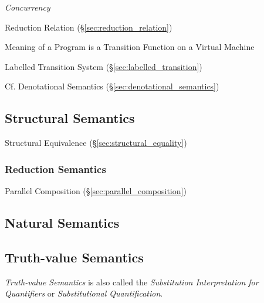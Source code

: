 \emph{Concurrency}

Reduction Relation (\S\ref{sec:reduction_relation})

Meaning of a Program is a Transition Function on a Virtual Machine

Labelled Transition System (\S\ref{sec:labelled_transition})

\fist Cf. Denotational Semantics (\S\ref{sec:denotational_semantics})



\subsection{Structural Semantics}\label{sec:structural_semantics}

Structural Equivalence (\S\ref{sec:structural_equality})



\subsubsection{Reduction Semantics}\label{sec:reduction_semantics}

Parallel Composition (\S\ref{sec:parallel_composition})



\subsection{Natural Semantics}\label{sec:natural_semantics}



\subsection{Truth-value Semantics}\label{sec:truthvalue_semantics}

\emph{Truth-value Semantics} is also called the \emph{Substitution
  Interpretation for Quantifiers} or \emph{Substitutional
  Quantification}.



